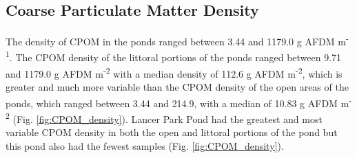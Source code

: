 \subsection{Coarse Particulate Matter Density}

The density of CPOM in the ponds ranged between 3.44 and 1179.0 g AFDM m\textsuperscript{-1}. The CPOM density of the littoral portions of the ponds ranged between 9.71 and 1179.0 g AFDM m\textsuperscript{-2} with a median density of 112.6 g AFDM m\textsuperscript{-2}, which is greater and much more variable than the CPOM density of the open areas of the ponds, which ranged between 3.44 and 214.9, with a median of 10.83 g AFDM m\textsuperscript{-2} (Fig. \ref{fig:CPOM_density}). Lancer Park Pond had the greatest and most variable CPOM density in both the open and littoral portions of the pond but this pond also had the fewest samples (Fig. \ref{fig:CPOM_density}). 
  
